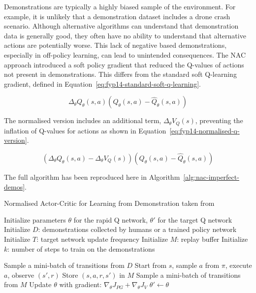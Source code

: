 Demonstrations are typically a highly biased sample of the environment.
For example, it is unlikely that a demonstration dataset includes a drone crash scenario.
Although alternative algorithms can understand that demonstration data is generally good, they often have no ability to understand that alternative actions are potentially worse.
This lack of negative based demonstrations, especially in off-policy learning, can lead to unintended consequences.
The NAC approach introduced a soft policy gradient that reduced the Q-values of actions not present in demonstrations.
This differs from the standard soft Q-learning gradient, defined in Equation~\ref{eq:fyp14-standard-soft-q-learning}.

\begin{equation}
  \Delta_{\theta} Q_{\theta}(s, a)(Q_{\theta}(s, a) - \hat{Q}_{\theta}(s, a))
  \label{eq:fyp14-standard-soft-q-learning}
\end{equation}

The normalised version includes an additional term, $\Delta_{\theta} V_Q(s)$, preventing the inflation of Q-values for actions as shown in Equation~\ref{eq:fyp14-normalised-q-version}.

\begin{equation}
  (\Delta_{\theta} Q_{\theta}(s, a) - \Delta_{\theta} V_Q(s))(Q_{\theta}(s, a) - \hat{Q}_{\theta}(s, a))
  \label{eq:fyp14-normalised-q-version}
\end{equation}

The full algorithm has been reproduced here in Algorithm~\ref{alg:nac-imperfect-demos}.

\begin{algorithm}
\caption{Normalised Actor-Critic for Learning from Demonstration taken from~\cite{fyp14-rl-imperfect-demos}}
\label{alg:nac-imperfect-demos}
\begin{algorithmic}[1] %
\State Initialize parameters $\theta$ for the rapid Q network, $\theta'$ for the target Q network
\State Initialize $D$: demonstrations collected by humans or a trained policy network
\State Initialize $T$: target network update frequency
\State Initialize $M$: replay buffer
\State Initialize $k$: number of steps to train on the demonstrations

        \State Sample a mini-batch of transitions from $D$
    \Else
        \State Start from $s$, sample $a$ from $\pi$, execute $a$, observe $(s',r)$
        \State Store $(s, a, r, s')$ in $M$
        \State Sample a mini-batch of transitions from $M$
    \EndIf
    \State Update $\theta$ with gradient: $\nabla_\theta J_{PG} + \nabla_\theta J_V$
        \State $\theta' \gets \theta$
    \EndIf
\EndFor
\end{algorithmic}
\end{algorithm}

